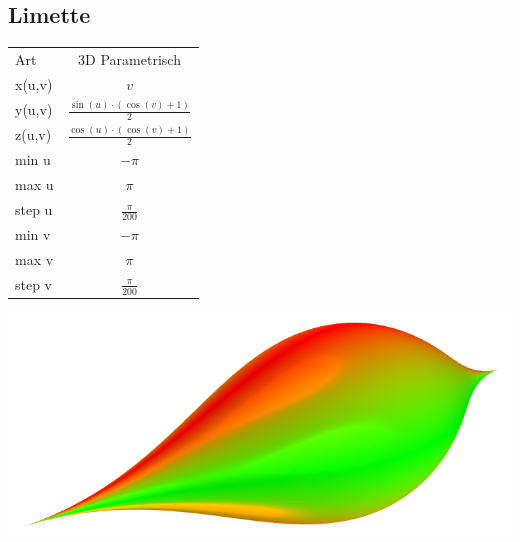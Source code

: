 \documentclass{scrartcl}
\begin{document}
\subsection{Limette}
\begin{tabular}[b]{|l|c|}
\hline
\rowcolor[gray]{0.5}
Art & 3D Parametrisch \\
\rowcolor[gray]{1}
x(u,v) & \(v\) \\
\rowcolor[gray]{0.5}
y(u,v) & \(\frac{\sin(u) \cdot (\cos(v) + 1)}{2}\) \\
\rowcolor[gray]{1}
z(u,v) &  \(\frac{\cos(u) \cdot (\cos(v) + 1)}{2}\) \\
\rowcolor[gray]{0.5}
min u & \(-\pi\) \\
\rowcolor[gray]{1}
max u & \(\pi\) \\
\rowcolor[gray]{0.5}
step u & \(\frac{\pi}{200}\) \\
\rowcolor[gray]{1}
min v & \(-\pi\) \\
\rowcolor[gray]{0.5}
max v & \(\pi\) \\
\rowcolor[gray]{1}
step v &\(\frac{\pi}{200}\) \\
\hline
\end{tabular}
\includegraphics[height=0.22\textheight]{images/graphs/limette.png}
\end{document}
